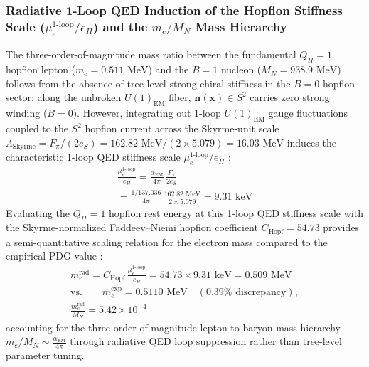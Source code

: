 \documentclass[10pt,aps,prd,twocolumn,superscriptaddress,nofootinbib,floatfix,longbibliography,showkeys]{revtex4-2}
\begin{document}
\subsubsection{Radiative 1-Loop QED Induction of the Hopfion Stiffness Scale ($\mu_e^{\text{1-loop}} / e_H$) and the $m_e / M_N$ Mass Hierarchy}

The three-order-of-magnitude mass ratio between the fundamental $Q_H = 1$ hopfion lepton ($m_e = 0.511\text{ MeV}$) and the $B=1$ nucleon ($M_N = 938.9\text{ MeV}$) follows from the absence of tree-level strong chiral stiffness in the $B=0$ hopfion sector: along the unbroken $U(1)_{\text{EM}}$ fiber, $\mathbf{n}(\mathbf{x}) \in S^2$ carries zero strong winding ($B=0$). However, integrating out 1-loop $U(1)_{\text{EM}}$ gauge fluctuations coupled to the $S^2$ hopfion current across the Skyrme-unit scale $\Lambda_{\text{Skyrme}} = F_\pi / (2 e_S) = 162.82\text{ MeV} / (2 \times 5.079) = 16.03\text{ MeV}$ induces the characteristic 1-loop QED stiffness scale $\mu_e^{\text{1-loop}} / e_H$ \cite{ref19,ref20}:
\begin{multline}
\frac{\mu_e^{\text{1-loop}}}{e_H} = \frac{\alpha_{\text{EM}}}{4\pi}\,\frac{F_\pi}{2 e_S} \\
= \frac{1/137.036}{4\pi}\,\frac{162.82\text{ MeV}}{2 \times 5.079} = 9.31\text{ keV}
\end{multline}
Evaluating the $Q_H = 1$ hopfion rest energy at this 1-loop QED stiffness scale with the Skyrme-normalized Faddeev--Niemi hopfion coefficient $C_{\text{Hopf}} = 54.73$ provides a semi-quantitative scaling relation for the electron mass compared to the empirical PDG value \cite{ref19,ref20}:
\begin{equation}\begin{gathered}
m_e^{\text{rad}} = C_{\text{Hopf}}\,\frac{\mu_e^{\text{1-loop}}}{e_H} = 54.73 \times 9.31\text{ keV} = 0.509\text{ MeV} \\
\text{vs.} \qquad m_e^{\text{exp}} = 0.5110\text{ MeV} \quad (0.39\%\text{ discrepancy}), \\
\frac{m_e^{\text{rad}}}{M_N} = 5.42 \times 10^{-4}
\end{gathered}\end{equation}
accounting for the three-order-of-magnitude lepton-to-baryon mass hierarchy $m_e / M_N \sim \frac{\alpha_{\text{EM}}}{4\pi}$ through radiative QED loop suppression rather than tree-level parameter tuning.
\end{document}
